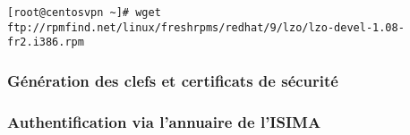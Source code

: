 \verb|[root@centosvpn ~]# wget ftp://rpmfind.net/linux/freshrpms/redhat/9/lzo/lzo-devel-1.08-fr2.i386.rpm|

\subsubsection{Génération des clefs et certificats de sécurité}

\subsubsection{Authentification via l'annuaire de l'ISIMA}

\pagebreak


% 
